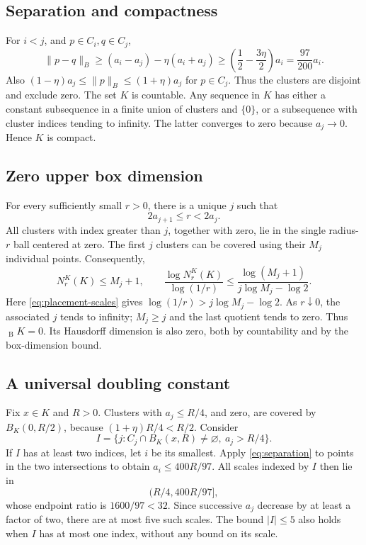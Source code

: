 \documentclass[
  11pt,
]{article}
\theoremstyle{remark}\newtheorem{remark}[theorem]{Remark}
\newcommand{\norm}[1]{\lVert#1\rVert}\newcommand{\ip}[2]{\langle#1,#2\rangle}
\newcommand{\dimB}{\mathop{\overline{\dim}}\nolimits_{\mathrm B}}
\begin{document}
\subsection{Separation and compactness}
For $i<j$, and $p\in C_i,q\in C_j$,
\begin{equation}\label{eq:separation}
 \norm{p-q}_B\ge(a_i-a_j)-\eta(a_i+a_j)
 \ge\left(\frac12-\frac{3\eta}{2}\right)a_i
 =\frac{97}{200}a_i.
\end{equation}
Also $(1-\eta)a_j\le\norm p_B\le(1+\eta)a_j$ for $p\in C_j$. Thus the clusters are disjoint and exclude zero. The set $K$ is countable. Any sequence in $K$ has either a constant subsequence in a finite union of clusters and $\{0\}$, or a subsequence with cluster indices tending to infinity. The latter converges to zero because $a_j\to0$. Hence $K$ is compact.

\subsection{Zero upper box dimension}
For every sufficiently small $r>0$, there is a unique $j$ such that
\[
 2a_{j+1}\le r<2a_j.
\]
All clusters with index greater than $j$, together with zero, lie in the single radius-$r$ ball centered at zero. The first $j$ clusters can be covered using their $M_j$ individual points. Consequently,
\[
 N_r^K(K)\le M_j+1,
 \qquad
 \frac{\log N_r^K(K)}{\log(1/r)}
 \le\frac{\log(M_j+1)}{j\log M_j-\log2}.
\]
Here \eqref{eq:placement-scales} gives $\log(1/r)>j\log M_j-\log2$. As $r\downarrow0$, the associated $j$ tends to infinity; $M_j\ge j$ and the last quotient tends to zero. Thus $\dimB K=0$. Its Hausdorff dimension is also zero, both by countability and by the box-dimension bound.

\subsection{A universal doubling constant}
Fix $x\in K$ and $R>0$. Clusters with $a_j\le R/4$, and zero, are covered by $B_K(0,R/2)$, because $(1+\eta)R/4<R/2$. Consider
\[
 I=\{j:C_j\cap B_K(x,R)\ne\varnothing,\ a_j>R/4\}.
\]
If $I$ has at least two indices, let $i$ be its smallest. Apply \eqref{eq:separation} to points in the two intersections to obtain $a_i\le400R/97$. All scales indexed by $I$ then lie in
\[
 (R/4,400R/97],
\]
whose endpoint ratio is $1600/97<32$. Since successive $a_j$ decrease by at least a factor of two, there are at most five such scales. The bound $|I|\le5$ also holds when $I$ has at most one index, without any bound on its scale.
\end{document}

